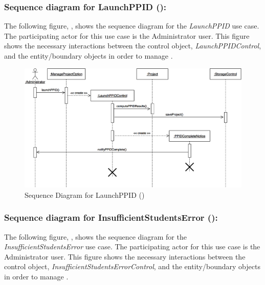 \documentclass[12pt,letterpaper]{article}
\begin{document}
\subsubsection*{Sequence diagram for LaunchPPID ():}

The following figure, , shows the sequence diagram for the {\it LaunchPPID} use case. The participating actor for this use case is
the Administrator user. This figure shows the necessary interactions between the control object, {\it LaunchPPIDControl}, and the
entity/boundary objects in order to manage .

\begin{figure}[H]
	\centering{}
	\includegraphics[scale=0.25]{imgs/seq/launch-ppid.png}
	\caption[ - Sequence Diagram for LaunchPPID]{Sequence Diagram for LaunchPPID ()}
\end{figure}

\subsubsection*{Sequence diagram for InsufficientStudentsError ():}

The following figure, , shows the sequence diagram for the {\it InsufficientStudentsError} use case. The participating actor for this use case is
the Administrator user. This figure shows the necessary interactions between the control object, {\it InsufficientStudentsErrorControl}, and the
entity/boundary objects in order to manage .
\end{document}
